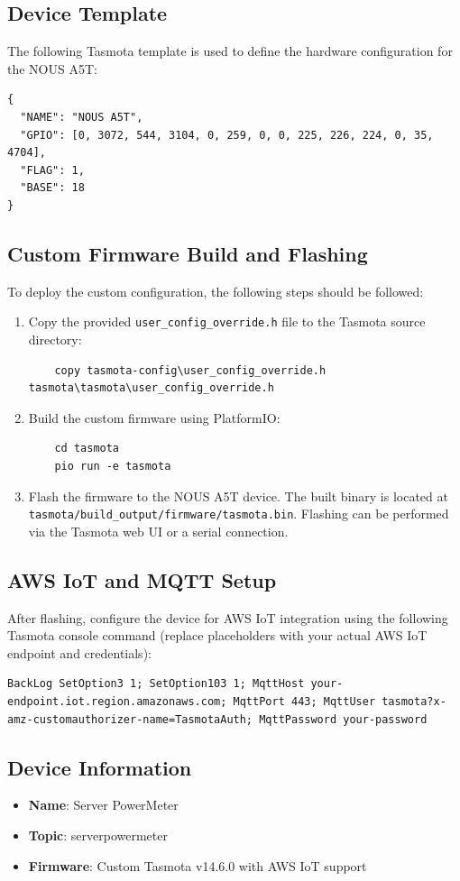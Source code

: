 \subsection{Device Template}
The following Tasmota template is used to define the hardware configuration for the NOUS A5T:
\begin{lstlisting}
{
  "NAME": "NOUS A5T",
  "GPIO": [0, 3072, 544, 3104, 0, 259, 0, 0, 225, 226, 224, 0, 35, 4704],
  "FLAG": 1,
  "BASE": 18
}
\end{lstlisting}

\subsection{Custom Firmware Build and Flashing}
To deploy the custom configuration, the following steps should be followed:
\begin{enumerate}
    \item Copy the provided \texttt{user\_config\_override.h} file to the Tasmota source directory:
    \begin{lstlisting}
    copy tasmota-config\user_config_override.h tasmota\tasmota\user_config_override.h
    \end{lstlisting}
    \item Build the custom firmware using PlatformIO:
    \begin{lstlisting}
    cd tasmota
    pio run -e tasmota
    \end{lstlisting}
    \item Flash the firmware to the NOUS A5T device. The built binary is located at \lstinline|tasmota/build_output/firmware/tasmota.bin|. Flashing can be performed via the Tasmota web UI or a serial connection.
\end{enumerate}

\subsection{AWS IoT and MQTT Setup}
After flashing, configure the device for AWS IoT integration using the following Tasmota console command (replace placeholders with your actual AWS IoT endpoint and credentials):
\begin{lstlisting}
BackLog SetOption3 1; SetOption103 1; MqttHost your-endpoint.iot.region.amazonaws.com; MqttPort 443; MqttUser tasmota?x-amz-customauthorizer-name=TasmotaAuth; MqttPassword your-password
\end{lstlisting}

\subsection{Device Information}
\begin{itemize}
    \item \textbf{Name}: Server PowerMeter
    \item \textbf{Topic}: serverpowermeter
    \item \textbf{Firmware}: Custom Tasmota v14.6.0 with AWS IoT support
\end{itemize}

